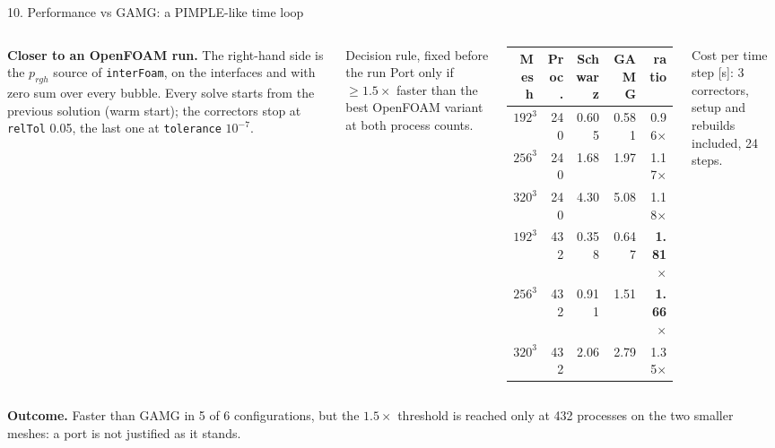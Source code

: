 \documentclass[aspectratio=169,10pt]{beamer}
\newcommand{\code}[1]{\texttt{#1}}
\newcommand{\muted}[1]{{\color{ink2}#1}}
\newcommand{\good}[1]{{\color{schwarz!85!black}\textbf{#1}}}
\begin{document}
\begin{frame}{10. Performance vs GAMG: a PIMPLE-like time loop}
  \begin{columns}[T,onlytextwidth]
    \small\setlength{\parskip}{5pt}%
    \textbf{\color{schwarz}Closer to an OpenFOAM run.} The right-hand side is the $p_{rgh}$ source of
    \code{interFoam}, on the interfaces and with zero sum over every bubble. Every solve starts from the
    previous solution (\alert{warm start}); the correctors stop at \code{relTol} 0.05, the last one at
    \code{tolerance} $10^{-7}$.

    \begin{exampleblock}{Decision rule, fixed before the run}
      \footnotesize Port only if $\ge1.5\times$ faster than the best OpenFOAM variant at both process counts.
    \end{exampleblock}
    \centering\footnotesize
    \begin{tabular}{@{}rrrrr@{}}
      \toprule
      Mesh & Proc. & Schwarz & GAMG & ratio\\
      \midrule
      $192^3$ & 240 & 0.605 & 0.581 & 0.96$\times$\\
      $256^3$ & 240 & 1.68  & 1.97  & 1.17$\times$\\
      $320^3$ & 240 & 4.30  & 5.08  & 1.18$\times$\\
      $192^3$ & 432 & 0.358 & 0.647 & \good{1.81$\times$}\\
      $256^3$ & 432 & 0.911 & 1.51  & \good{1.66$\times$}\\
      $320^3$ & 432 & 2.06  & 2.79  & 1.35$\times$\\
      \bottomrule
    \end{tabular}\par\vspace{0.5mm}
    {\scriptsize\muted{Cost per time step [s]: 3 correctors, setup and rebuilds included, 24 steps.}\par}
  \end{columns}
  \vspace{3mm}
  \small\textbf{\color{schwarz}Outcome.} Faster than GAMG in 5 of 6 configurations, but the $1.5\times$
  threshold is reached only at 432 processes on the two smaller meshes: a port is \alert{not justified as it
  stands}.
\end{frame}
\end{document}
